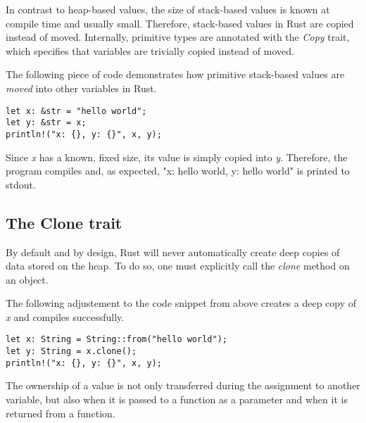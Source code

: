 \documentclass[sigplan,11pt,nonacm]{acmart}
\begin{document}
In contrast to heap-based values, the size of stack-based values is known at compile time and usually small.
Therefore, stack-based values in Rust are copied instead of moved.
Internally, primitive types are annotated with the \emph{Copy} trait, which specifies that variables are trivially copied instead of moved.



The following piece of code demonstrates how primitive stack-based values are \emph{moved} into other variables in Rust.
\begin{lstlisting}
let x: &str = "hello world";
let y: &str = x;
println!("x: {}, y: {}", x, y);
\end{lstlisting}
Since \emph{x} has a known, fixed size, its value is simply copied into \emph{y}.
Therefore, the program compiles and, as expected, "x: hello world, y: hello world" is printed to stdout.

\cite{rust-book}





\subsection{The Clone trait}

By default and by design, Rust will never automatically create deep copies of data stored on the heap.
To do so, one must explicitly call the \emph{clone} method on an object.

The following adjustement to the code snippet from above creates a deep copy of \emph{x} and compiles successfully.
\begin{lstlisting}
let x: String = String::from("hello world");
let y: String = x.clone();
println!("x: {}, y: {}", x, y);
\end{lstlisting}

The ownership of a value is not only transferred during the assignment to another variable, but also when it is passed to a function as a parameter and when it is returned from a function.
\end{document}
